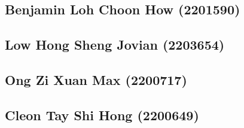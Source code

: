\subsection{Benjamin Loh Choon How (2201590)}

\subsection{Low Hong Sheng Jovian (2203654)}

\subsection{Ong Zi Xuan Max (2200717)}

\subsection{Cleon Tay Shi Hong (2200649)}
